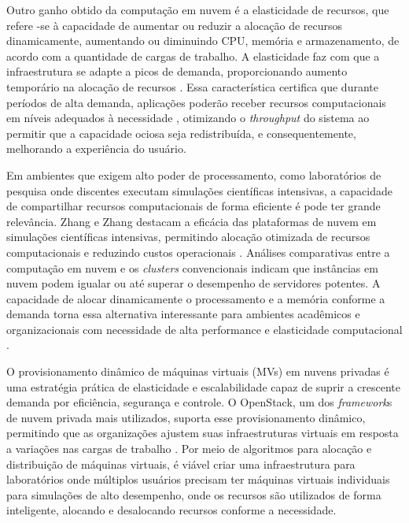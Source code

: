 Outro ganho obtido da computação em nuvem é a elasticidade de recursos, que refere -se à capacidade de aumentar ou reduzir a alocação de recursos dinamicamente, aumentando ou diminuindo CPU, memória e armazenamento, de acordo com a quantidade de cargas de trabalho. A elasticidade faz com que a infraestrutura se adapte a picos de demanda, proporcionando aumento temporário na alocação de recursos \cite{armbrust2010}. Essa característica certifica que durante períodos de alta demanda, aplicações poderão receber recursos computacionais em níveis adequados à necessidade \cite{oliveira2015}, otimizando o \textit{throughput} do sistema ao permitir que a capacidade ociosa seja redistribuída, e consequentemente, melhorando a experiência do usuário.

Em ambientes que exigem alto poder de processamento, como laboratórios de pesquisa onde discentes executam simulações científicas intensivas, a capacidade de compartilhar recursos computacionais de forma eficiente é pode ter grande relevância. Zhang e Zhang destacam a eficácia das plataformas de nuvem em simulações científicas intensivas, permitindo alocação otimizada de recursos computacionais e reduzindo custos operacionais \cite{xu2021}. Análises comparativas entre a computação em nuvem e os \textit{clusters} convencionais indicam que instâncias em nuvem podem igualar ou até superar o desempenho de servidores potentes. A capacidade de alocar dinamicamente o processamento e a memória conforme a demanda torna essa alternativa interessante para ambientes acadêmicos e organizacionais com necessidade de alta performance e elasticidade computacional \cite{roloff2012}. 

O provisionamento dinâmico de máquinas virtuais (MVs) em nuvens privadas é uma estratégia prática de elasticidade e escalabilidade capaz de suprir a crescente demanda por eficiência, segurança e controle. O OpenStack, um dos \textit{framework}s de nuvem privada mais utilizados, suporta esse provisionamento dinâmico, permitindo que as organizações ajustem suas infraestruturas virtuais em resposta a variações nas cargas de trabalho \cite{callegati2016}. Por meio de algoritmos para alocação e distribuição de máquinas virtuais, é viável criar uma infraestrutura para laboratórios onde múltiplos usuários precisam ter máquinas virtuais individuais para simulações de alto desempenho, onde os recursos são utilizados de forma inteligente, alocando e desalocando recursos conforme a necessidade.

